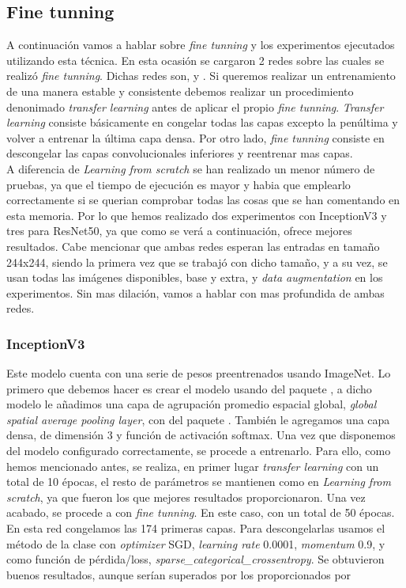 \subsection{Fine tunning}

A continuación vamos a hablar sobre \textit{fine tunning} y los experimentos ejecutados utilizando esta técnica. En esta ocasión se cargaron 2 redes sobre las cuales se realizó \textit{fine tunning}. Dichas redes son,  y . Si queremos realizar un entrenamiento de una manera estable y consistente debemos realizar un procedimiento denonimado \textit{transfer learning} antes de aplicar el propio \textit{fine tunning}. \textit{Transfer learning} consiste básicamente en congelar todas las capas excepto la penúltima y volver a entrenar la última capa densa. Por otro lado, \textit{fine tunning} consiste en descongelar las capas convolucionales inferiores y reentrenar mas capas.\\

A diferencia de \textit{Learning from scratch} se han realizado un menor número de pruebas, ya que el tiempo de ejecución es mayor y habia que emplearlo correctamente si se querian comprobar todas las cosas que se han comentando en esta memoria. Por lo que hemos realizado dos experimentos con InceptionV3 y tres para ResNet50, ya que como se verá a continuación, ofrece mejores resultados. Cabe mencionar que ambas redes esperan las entradas en tamaño 244x244, siendo la primera vez que se trabajó con dicho tamaño, y a su vez, se usan todas las imágenes disponibles, base y extra, y \textit{data augmentation} en los experimentos. Sin mas dilación, vamos a hablar con mas profundida de ambas redes.\\
 
\subsubsection{InceptionV3}

Este modelo cuenta con una serie de pesos preentrenados usando ImageNet. Lo primero que debemos hacer es crear el modelo usando  del paquete , a dicho modelo le añadimos una capa de agrupación promedio espacial global, \textit{global spatial average pooling layer}, con  del paquete . También le agregamos una capa densa, de dimensión 3 y función de activación softmax. Una vez que disponemos del modelo configurado correctamente, se procede a entrenarlo. Para ello, como hemos mencionado antes, se realiza, en primer lugar \textit{transfer learning} con un total de 10 épocas, el resto de parámetros se mantienen como en \textit{Learning from scratch}, ya que fueron los que mejores resultados proporcionaron. Una vez acabado, se procede a con \textit{fine tunning}. En este caso, con un total de 50 épocas. En esta red congelamos las 174 primeras capas. Para descongelarlas usamos el método  de la clase  con \textit{optimizer} SGD, \textit{learning rate} 0.0001, \textit{momentum} 0.9, y como función de pérdida/loss, \textit{sparse\_categorical\_crossentropy}. Se obtuvieron buenos resultados, aunque serían superados por los proporcionados por 

